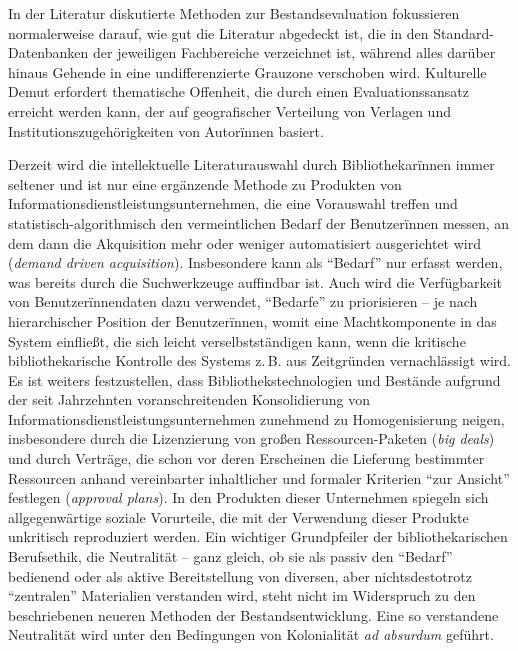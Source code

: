 \documentclass[a4paper,
fontsize=11pt,
oneside,
numbers=noperiodatend,
parskip=half-,
bibliography=totoc,
final
]{scrartcl}
\begin{document}
In der Literatur diskutierte Methoden zur Bestandsevaluation fokussieren
normalerweise darauf, wie gut die Literatur abgedeckt ist, die in den
Standard-Datenbanken der jeweiligen Fachbereiche verzeichnet ist,
während alles darüber hinaus Gehende in eine undifferenzierte Grauzone
verschoben wird. Kulturelle Demut erfordert thematische Offenheit, die
durch einen Evaluationssansatz erreicht werden kann, der auf
geografischer Verteilung von Verlagen und Institutionszugehörigkeiten
von Autorïnnen basiert.

Derzeit wird die intellektuelle Literaturauswahl durch Bibliothekarïnnen
immer seltener und ist nur eine ergänzende Methode zu Produkten von
Informationsdienstleistungsunternehmen, die eine Vorauswahl treffen und
statistisch-algorithmisch den vermeintlichen Bedarf der Benutzerïnnen
messen, an dem dann die Akquisition mehr oder weniger automatisiert
ausgerichtet wird (\emph{demand driven acquisition}). Insbesondere kann
als \enquote{Bedarf} nur erfasst werden, was bereits durch die
Suchwerkzeuge auffindbar ist. Auch wird die Verfügbarkeit von
Benutzerïnnendaten dazu verwendet, \enquote{Bedarfe} zu priorisieren --
je nach hierarchischer Position der Benutzerïnnen, womit eine
Machtkomponente in das System einfließt, die sich leicht
verselbstständigen kann, wenn die kritische bibliothekarische Kontrolle
des Systems z. B. aus Zeitgründen vernachlässigt wird. Es ist weiters
festzustellen, dass Bibliothekstechnologien und Bestände aufgrund der
seit Jahrzehnten voranschreitenden Konsolidierung von
Informationsdienstleistungsunternehmen zunehmend zu Homogenisierung
neigen, insbesondere durch die Lizenzierung von großen
Ressourcen-Paketen (\emph{big deals}) und durch Verträge, die schon vor
deren Erscheinen die Lieferung bestimmter Ressourcen anhand vereinbarter
inhaltlicher und formaler Kriterien \enquote{zur Ansicht} festlegen
(\emph{approval plans}). In den Produkten dieser Unternehmen spiegeln
sich allgegenwärtige soziale Vorurteile, die mit der Verwendung dieser
Produkte unkritisch reproduziert werden. Ein wichtiger Grundpfeiler der
bibliothekarischen Berufsethik, die Neutralität -- ganz gleich, ob sie
als passiv den \enquote{Bedarf} bedienend oder als aktive Bereitstellung
von diversen, aber nichtsdestotrotz \enquote{zentralen} Materialien
verstanden wird, steht nicht im Widerspruch zu den beschriebenen neueren
Methoden der Bestandsentwicklung. Eine so verstandene Neutralität wird
unter den Bedingungen von Kolonialität \emph{ad absurdum} geführt.
\end{document}
